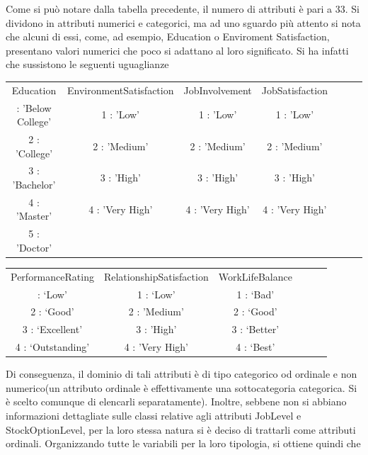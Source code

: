 \documentclass[english]{article}
\begin{document}
Come si può notare dalla tabella precedente, il numero di attributi è pari a 33. Si dividono in attributi numerici e categorici, ma ad uno sguardo più attento si nota che alcuni di essi, come, ad esempio, Education o Enviroment Satisfaction, presentano valori numerici che poco si adattano al loro significato. Si ha infatti che sussistono le seguenti uguaglianze 

\begin{center}
\begin{tabular}{|c|c|c|c|c|c|c|}
\arrayrulecolor{white}\hline
Education & EnvironmentSatisfaction & JobInvolvement & JobSatisfaction \\
\arrayrulecolor{white}\hline
1 : 'Below College' & 1 : 'Low'  & 1 : 'Low'& 1 : 'Low' \\
2 : 'College'  & 2 : 'Medium' & 2 : 'Medium'& 2 : 'Medium'\\
3 : 'Bachelor'    &3 : 'High' & 3 : 'High'& 3 : 'High'  \\
4 : 'Master'    &4 : 'Very High' & 4 : 'Very High' & 4 : 'Very High' \\
5 : 'Doctor'  &  & &\\
\hline
\end{tabular}
\end{center}


\begin{center}
\begin{tabular}{|c|c|c|c|c|c|}
\arrayrulecolor{white}\hline
PerformanceRating & RelationshipSatisfaction&WorkLifeBalance  &   \quad\quad&\quad\quad    &\quad\quad      \\
\arrayrulecolor{white}\hline
1 : `Low' & 1 : `Low' & 1 : `Bad'&&&\\
2 : `Good' & 2 : 'Medium'& 2 : `Good'&&&\\
3 : `Excellent'& 3 : 'High' & 3 : `Better'&&&\\
4 : `Outstanding'& 4 : 'Very High' &4 : `Best'&&&\\
\hline
\end{tabular}
\end{center}


Di conseguenza, il dominio di tali attributi è di tipo categorico od ordinale e non numerico(un attributo ordinale è effettivamente una sottocategoria categorica. Si è scelto comunque di elencarli separatamente). Inoltre, sebbene non si abbiano informazioni dettagliate sulle classi relative agli attributi JobLevel e  StockOptionLevel, per la loro stessa natura si è deciso di trattarli come attributi ordinali. Organizzando tutte le variabili per la loro tipologia, si ottiene quindi che
\end{document}
